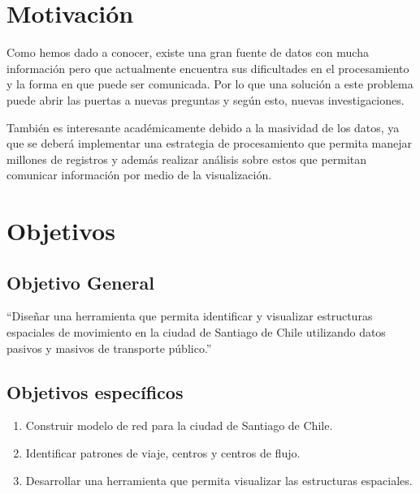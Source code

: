 \documentclass[12pt]{article}
\begin{document}
    \newpage
    \section{Motivación}


    Como hemos dado a conocer, existe una gran fuente de datos con mucha información pero que actualmente encuentra sus dificultades en el procesamiento y la forma en que puede ser comunicada. Por lo que una solución a este problema puede abrir las puertas a nuevas preguntas y según esto, nuevas investigaciones.

    También es interesante académicamente debido a la masividad de los datos, ya que se deberá implementar una estrategia de procesamiento que permita manejar millones de registros y además realizar análisis sobre estos que permitan comunicar información por medio de la visualización.

    \section{Objetivos}

    \subsection{Objetivo General}

    ``Diseñar una herramienta que permita identificar y visualizar estructuras espaciales de movimiento en la ciudad de Santiago de Chile utilizando datos pasivos y masivos de transporte público.''
    \subsection{Objetivos específicos}

    \begin{enumerate}
    \item Construir modelo de red para la ciudad de Santiago de Chile. %
    \item Identificar patrones de viaje, centros y centros de flujo.%
    \item Desarrollar una herramienta que permita visualizar las estructuras espaciales.
    \end{enumerate}
\end{document}
